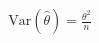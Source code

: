 \documentclass[preview]{standalone}
\begin{document}
\begin{align*}
\text{Var}(\hat{\theta}) = \frac{\theta^2}{n}
\end{align*}
\end{document}
